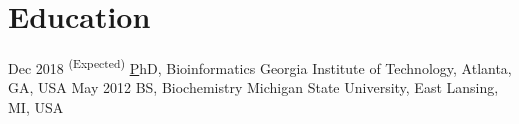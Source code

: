 \documentclass[letterpaper]{twentysecondcv} %
\begin{document}
\makeprofile %

\section{Education}

\begin{twenty} %
	\twentyitem
    	{Dec 2018}
        {\textsuperscript{(Expected)}}
        {\href{http://http://bioinformatics.gatech.edu/phd-curriculum/}PhD, Bioinformatics}
        {{Georgia Institute of Technology, Atlanta, GA, USA}}
        {}
        {}
	\twentyitem
    	{May 2012}
		{}
        {BS, Biochemistry}
        {{Michigan State University, East Lansing, MI, USA}}
        {}
        {}
\end{twenty}
\end{document}
